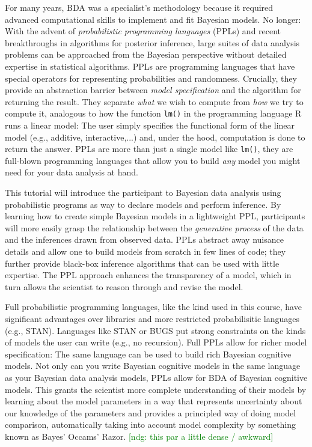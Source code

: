 \documentclass[10pt,letterpaper]{article}
\newcommand{\ndg}[1]{\textcolor{green}{[ndg: #1]}}
\begin{document}
For many years, BDA was a specialist's methodology because it required advanced computational skills to implement and fit Bayesian models.
No longer: With the advent of \emph{probabilistic programming languages} (PPLs) and recent breakthroughs in algorithms for posterior inference, large suites of data analysis problems can be approached from the Bayesian perspective without detailed expertise in statistical algorithms. 
PPLs are programming languages that have special operators for representing probabilities and randomness. 
Crucially, they provide an abstraction barrier between \emph{model specification} and the algorithm for returning the result.
They separate \emph{what} we wish to compute from  \emph{how} we try to compute it, analogous to how the function \lstinline{lm()} in the programming language R runs a linear model: The user simply specifies the functional form of the linear model (e.g., additive, interactive,...) and, under the hood, computation is done to return the answer.
PPLs are more than just a single model like \lstinline{lm()}, they are full-blown programming languages that allow you to build \emph{any} model you might need for your data analysis at hand.

This tutorial will introduce the participant to Bayesian data analysis using probabilistic programs as way to declare models and perform inference. 
By learning how to create simple Bayesian models in a lightweight PPL, participants will more easily grasp the relationship between the \emph{generative process} of the data and the inferences drawn from observed data.
PPLs abstract away nuisance details and allow one to build models from scratch in few lines of code; they further provide black-box inference algorithms that can be used with little expertise.
The PPL approach enhances the transparency of a model, which in turn allows the scientist to reason through and revise the model. 

Full probabilistic programming languages, like the kind used in this course, have significant advantages over libraries and more restricted probabilisitic languages (e.g., STAN).  
Languages like STAN or BUGS put strong constraints on the kinds of models the user can write (e.g., no recursion). 
Full PPLs allow for richer model specification: The same language can be used to build rich Bayesian cognitive models. 
Not only can you write Bayesian cognitive models in the same language as your Bayesian data analysis models, PPLs allow for BDA of Bayesian cognitive models. 
This grants the scientist more complete understanding of their models by learning about the model parameters in a way that represents uncertainty about our knowledge of the parameters and provides a principled way of doing model comparison, automatically taking into account model complexity by something known as Bayes' Occams' Razor.
\ndg{this par a little dense / awkward}
\end{document}

